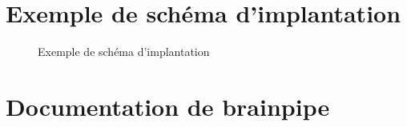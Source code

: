 \section{Exemple de sch\'{e}ma d'implantation}
\begin{figure}[H]
	\centering
	\caption{Exemple de sch\'{e}ma d'implantation}
	\label{schema_implantation}
\end{figure}

\section{Documentation de brainpipe}

